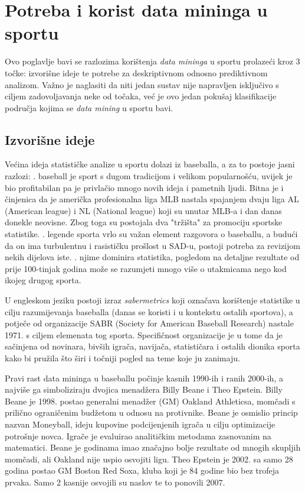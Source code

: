 \documentclass{ferseminar}
\begin{document}
\section{Potreba i korist data mininga u sportu}

Ovo poglavlje bavi se razlozima korištenja \textit{data mininga} u sportu prolazeći kroz 3 točke: izvorišne ideje te potrebe za deskriptivnom odnosno prediktivnom analizom. Važno je naglasiti da niti jedan sustav nije napravljen isključivo s ciljem zadovoljavanja neke od točaka, već je ovo jedan pokušaj klasifikacije područja kojima se \textit{data mining} u sportu bavi.

\subsection{Izvorišne ideje}
Većina ideja statističke analize u sportu dolazi iz baseballa, a za to postoje jasni razlozi:
. baseball je sport s dugom tradicijom i velikom popularnošću, uvijek je bio profitabilan pa je privlačio mnogo novih ideja i pametnih ljudi. Bitna je i činjenica da je američka profesionalna liga MLB nastala spajanjem dvaju liga AL (American league) i NL (National league) koji su unutar MLB-a i dan danas donekle neovisne. Zbog toga su postojala dva "tržišta" za promociju sportske statistike.
. legende sporta vrlo su važan element razgovora o baseballu, a budući da on ima turbulentnu i rasističku prošlost u SAD-u, postoji potreba za revizijom nekih dijelova iste.
. njime dominira statistika, pogledom na detaljne rezultate od prije 100-tinjak godina može se razumjeti mnogo više o utakmicama nego kod ikojeg drugog sporta.\cite{mlb}
\newline

U engleskom jeziku postoji izraz \textit{sabermetrics} koji označava korištenje statistike u cilju razumijevanja baseballa (danas se koristi i u kontekstu ostalih sportova), a potječe od organizacije SABR (Society for American Baseball Research) nastale 1971. s ciljem elemenata tog sporta. Specifičnost organizacije je u tome da je sačinjena od novinara, bivših igrača, navijača, statističara i ostalih dionika sporta kako bi pružila što širi i točniji pogled na teme koje ju zanimaju.\cite{sabr}

Pravi rast data mininga u baseballu počinje kasnih 1990-ih i ranih 2000-ih, a najviše ga simboliziraju dvojica menadžera Billy Beane i Theo Epstein. Billy Beane je 1998. postao generalni menadžer (GM) Oakland Athleticsa, momčadi s prilično ograničenim budžetom u odnosu na protivnike. Beane je osmislio princip nazvan Moneyball, ideju kupovine podcijenjenih igrača u cilju optimizacije potrošnje novca. Igrače je evaluirao analitičkim metodama zasnovanim na matematici. Beane je godinama imao značajno bolje rezultate od mnogih skupljih momčadi, ali Oakland nije uspio osvojiti ligu. Theo Epstein je 2002. sa samo 28 godina postao GM Boston Red Soxa, kluba koji je 84
\newpage
\noindent godine bio bez trofeja prvaka. Samo 2 kasnije osvojili su naslov te to ponovili 2007.\cite{mlb}
\end{document}
